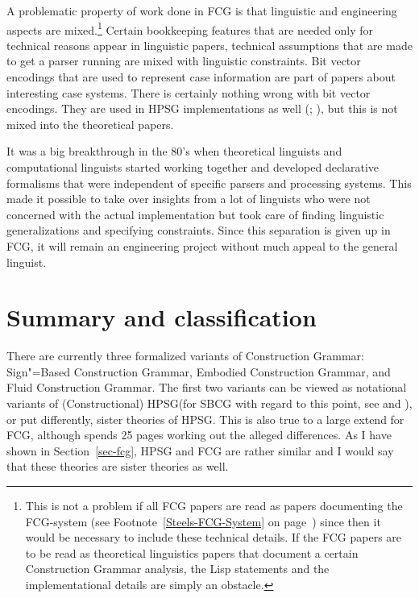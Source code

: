
A problematic property of work done in FCG is that linguistic and engineering aspects are mixed.\footnote{%
This is not a problem if all FCG papers are read as papers documenting the FCG-system (see
Footnote~\ref{Steels-FCG-System} on page~\pageref{Steels-FCG-System}) since then it
would be necessary to include these technical details. If the FCG papers are to be read as
theoretical linguistics papers that document a certain Construction Grammar analysis, the Lisp statements
and the implementational details are simply an obstacle.
} Certain bookkeeping features that are needed only
for technical reasons appear in linguistic papers, technical assumptions that are made to get a
parser running are mixed with linguistic constraints. Bit vector encodings that are used to
represent case information are part of papers about interesting case systems. There is certainly
nothing wrong with bit vector encodings. They are used in HPSG implementations as well
(\citealp[]{Reape91}; \citealp[]{Babel}), but this is
not mixed into the theoretical papers. 

It was a big breakthrough in the 80's when theoretical linguists and computational linguists started
working together and developed declarative formalisms that were independent of specific parsers and
processing systems. This made it possible to take over insights from a lot of linguists who were not
concerned with the actual implementation but took care of finding linguistic generalizations and
specifying constraints. Since this separation is given up in FCG, it will remain an engineering
project without much appeal to the general linguist.%
\indexhpsgend\indexsbcgend



\section{Summary and classification}

\largerpage
\begin{sloppypar}
There are currently three formalized variants of Construction Grammar: Sign"=Based Construction
Grammar, Embodied Construction Grammar, and Fluid Construction Grammar. The first two variants can
be viewed as notational variants of (Constructional) HPSG\indexhpsg (for SBCG with regard to this
point, see  and ), or put differently, sister
theories of HPSG. This is also true to a large extend for FCG, although \citet{vanTrijp2013a} spends
25 pages working out the alleged differences. As I have shown in Section~\ref{sec-fcg}, HPSG and FCG are
rather similar and I would say that these theories are sister theories as well. 
\end{sloppypar}

